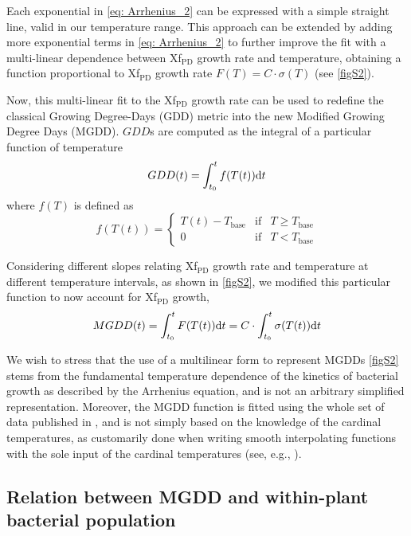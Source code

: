 Each exponential in \cref{eq: Arrhenius_2} can be expressed with a simple
straight line, valid in our temperature range. This approach can be extended by
adding more exponential terms in \cref{eq: Arrhenius_2} to further improve the
fit with a multi-linear dependence between Xf$_{\textrm{PD}}$ growth rate and
temperature, obtaining a function proportional to Xf$_{\textrm{PD}}$ growth
rate $F(T)=C\cdot\sigma(T)$ (see \cref{figS2}).

Now, this multi-linear fit to the Xf$_{\textrm{PD}}$ growth rate can be
used to redefine the classical Growing Degree-Days (GDD) metric into the new
Modified Growing Degree Days (MGDD). $GDD$s are computed as the integral of a
particular function of temperature
\begin{equation}
    GDD(t)=\int_{t_0}^tf(T(t))\mathrm{d} t
\end{equation}
where $f(T)$ is defined as
\begin{equation}
    f(T(t))=\left\{\begin{array}{ccc}
        T(t) - T_{\textrm{base}} & \textrm{if} & T\geq T_{\textrm{base}} \\
        0                        & \textrm{if} & T < T_{\textrm{base}}
    \end{array} \right.
\end{equation}

Considering different slopes relating Xf$_{\textrm{PD}}$ growth rate and
temperature at different temperature intervals, as shown in \cref{figS2}, we
modified this particular function to now account for Xf$_{\textrm{PD}}$ growth,
\begin{equation}\label{eq:MGDD_t}
    MGDD(t)=\int_{t_0}^tF(T(t))\mathrm{d} t=C\cdot\int_{t_0}^t\sigma(T(t))\mathrm{d} t
\end{equation}

We wish to stress that the use of a multilinear form to represent MGDDs
\cref{figS2} stems from the fundamental temperature dependence of the kinetics
of bacterial growth as described by the Arrhenius equation, and is not an
arbitrary simplified representation. Moreover, the MGDD function is fitted
using the whole set of data published in \cite{Feil2001}, and is not simply
based on the knowledge of the cardinal temperatures, as customarily done when
writing smooth interpolating functions with the sole input of the cardinal
temperatures (see, e.g., \cite{Yan1999}).

\subsection{Relation between MGDD and within-plant bacterial
    population}\label{app:MGDD_growth} %

